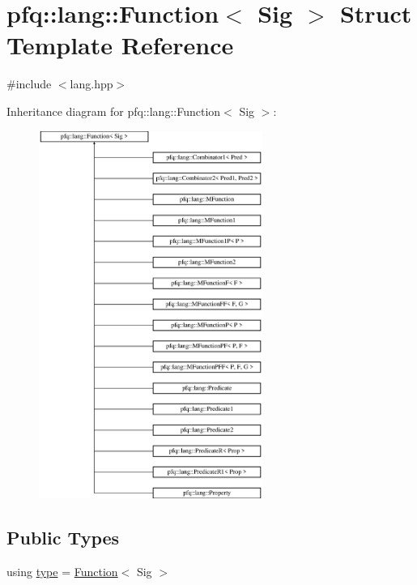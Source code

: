 \hypertarget{structpfq_1_1lang_1_1Function}{\section{pfq\+:\+:lang\+:\+:Function$<$ Sig $>$ Struct Template Reference}
\label{structpfq_1_1lang_1_1Function}
}


{\ttfamily \#include $<$lang.\+hpp$>$}

Inheritance diagram for pfq\+:\+:lang\+:\+:Function$<$ Sig $>$\+:\begin{figure}[H]
\begin{center}
\leavevmode
\includegraphics[height=12.000000cm]{structpfq_1_1lang_1_1Function}
\end{center}
\end{figure}
\subsection*{Public Types}
\begin{DoxyCompactItemize}
\item 
using \hyperlink{structpfq_1_1lang_1_1Function_ac7124e473c4804e25b24e9e15fe7b392}{type} = \hyperlink{structpfq_1_1lang_1_1Function}{Function}$<$ Sig $>$
\end{DoxyCompactItemize}


